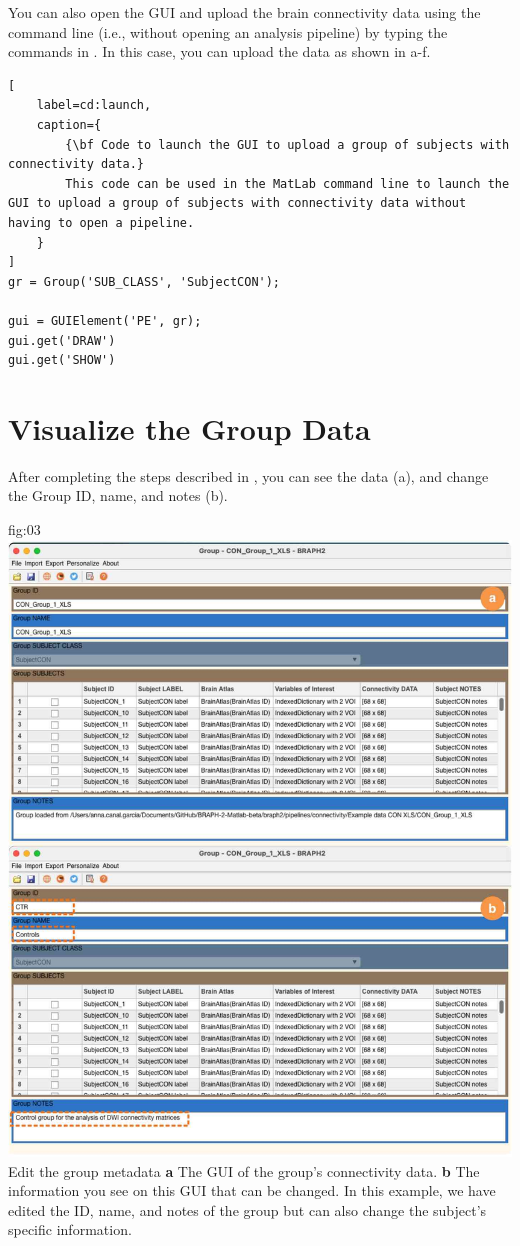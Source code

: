 \documentclass[justified]{tufte-handout}
\begin{document}
\begin{tcolorbox}[
	title=GUI launch from command line
]
You can also open the GUI and upload the brain connectivity data using the command line (i.e., without opening an analysis pipeline) by typing the commands in . In this case, you can upload the data as shown in a-f.

\begin{lstlisting}[
	label=cd:launch,
	caption={
		{\bf Code to launch the GUI to upload a group of subjects with connectivity data.}
		This code can be used in the MatLab command line to launch the GUI to upload a group of subjects with connectivity data without having to open a pipeline.
	}
]
gr = Group('SUB_CLASS', 'SubjectCON');

gui = GUIElement('PE', gr);
gui.get('DRAW')
gui.get('SHOW')
\end{lstlisting}
\end{tcolorbox}

\section{Visualize the Group Data}

After completing the steps described in , you can see the data (a), and change the Group ID, name, and notes (b). 

	{fig:03}
	{
	\includegraphics{fig03.jpg}
	}
	{Edit the group metadata}
	{ 
	{\bf a} The GUI of the group's connectivity data. 
	{\bf b} The information you see on this GUI that can be changed. In this example, we have edited the ID, name, and notes of the group but can also change the subject's specific information.
	}
	
\end{document}
